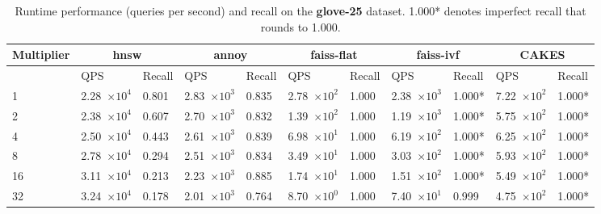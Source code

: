 \begin{table}[!t]
    \caption{Runtime performance (queries per second) and recall on the \textbf{glove-25} dataset. 1.000* denotes imperfect recall that rounds to 1.000.}
    \label{table:results:ann-glove-25}
    \vskip 0.15in
    \begin{center}
        \begin{small}
            \begin{sc}
                \begin{tabular}{|l|p{1.2cm}|p{0.8cm}|p{1.2cm}|p{0.8cm}|p{1.2cm}|p{0.8cm}|p{1.2cm}|p{0.8cm}|p{1.2cm}|p{0.8cm}|}
                    \hline
                    \textbf{Multiplier}  & \multicolumn{2}{|c|}{\textbf{hnsw}} & \multicolumn{2}{|c|}{\textbf{annoy}} & \multicolumn{2}{|c|}{\textbf{faiss-flat}} & \multicolumn{2}{|c|}{\textbf{faiss-ivf}}  & \multicolumn{2}{|c|}{\textbf{CAKES}} \\
                    \hline
                    &             QPS & Recall        & QPS & Recall      & QPS & Recall       & QPS & Recall     & QPS & Recall    \\
                    \hline
                    1   & 2.28~$\times10^{4}$ & 0.801 & 2.83~$\times10^{3}$ & 0.835 & 2.78~$\times10^{2}$ & 1.000 & 2.38~$\times10^{3}$ & 1.000* & 7.22~$\times10^{2}$ & 1.000* \\
                    \hline
                    2   & 2.38~$\times10^{4}$ & 0.607 & 2.70~$\times10^{3}$ & 0.832 & 1.39~$\times10^{2}$ & 1.000 & 1.19~$\times10^{3}$ & 1.000* & 5.75~$\times10^{2}$ & 1.000* \\
                    \hline
                    4   & 2.50~$\times10^{4}$ & 0.443 & 2.61~$\times10^{3}$ & 0.839 & 6.98~$\times10^{1}$ & 1.000 & 6.19~$\times10^{2}$ & 1.000* & 6.25~$\times10^{2}$ & 1.000* \\
                    \hline
                    8   & 2.78~$\times10^{4}$ & 0.294 & 2.51~$\times10^{3}$ & 0.834 & 3.49~$\times10^{1}$ & 1.000 & 3.03~$\times10^{2}$ & 1.000* & 5.93~$\times10^{2}$ & 1.000* \\
                    \hline
                    16  & 3.11~$\times10^{4}$ & 0.213 & 2.23~$\times10^{3}$ & 0.885 & 1.74~$\times10^{1}$ & 1.000 & 1.51~$\times10^{2}$ & 1.000* & 5.49~$\times10^{2}$ & 1.000* \\
                    \hline
                    32  & 3.24~$\times10^{4}$ & 0.178 & 2.01~$\times10^{3}$ & 0.764 & 8.70~$\times10^{0}$ & 1.000 & 7.40~$\times10^{1}$ & 0.999  & 4.75~$\times10^{2}$ & 1.000* \\

\end{tabular}
\end{sc}
\end{small}
\end{center}
\end{table}
